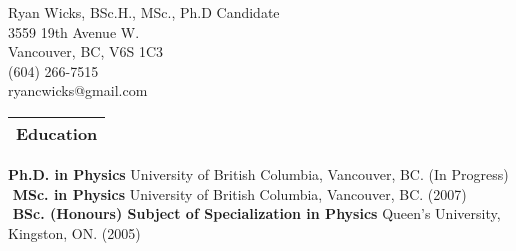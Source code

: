 \documentclass[letterpaper,12pt]{article}
\begin{document}
\begin{center}{ \addvspace{0.3cm}   \Large{Ryan Wicks, BSc.H., MSc., Ph.D Candidate} \\ \addvspace{0.5cm} \normalsize{3559 19th Avenue W. \\ Vancouver, BC, V6S 1C3 \\ (604) 266-7515\\ryancwicks@gmail.com}} \end{center} \addvspace {0.5cm}

\noindent \Large \begin{tabular}{|p{12cm}|} \hline \textbf{Education}\\ \hline \end{tabular}
\linebreak
\linebreak
\normalsize \textbf{Ph.D. in Physics} University of British Columbia, Vancouver, BC. (In Progress)\\
$ $\linebreak
\normalsize \textbf{MSc. in Physics} University of British Columbia, Vancouver, BC. (2007)\\
 $ $\linebreak
\normalsize \textbf{BSc. (Honours) Subject of Specialization in Physics} Queen's University, Kingston, ON. (2005)\\
$ $\linebreak
\end{document}
